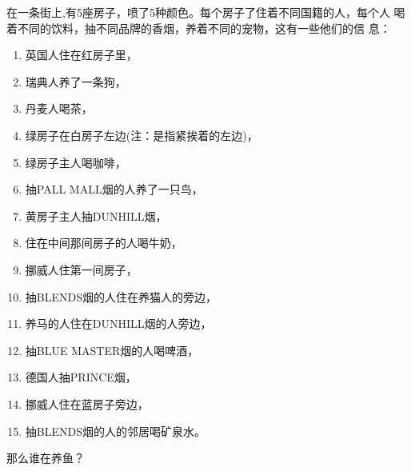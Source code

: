 \begin{example}[爱因斯坦难题]\label{ex:einstein's-problem}
  在一条街上,有5座房子，喷了5种颜色。每个房子了住着不同国籍的人，每个人
  喝着不同的饮料，抽不同品牌的香烟，养着不同的宠物，这有一些他们的信
  息：
  \begin{enumerate}
  \item 英国人住在红房子里，
  \item 瑞典人养了一条狗，
  \item 丹麦人喝茶，
  \item 绿房子在白房子左边(注：是指紧挨着的左边)，
  \item 绿房子主人喝咖啡，
  \item 抽PALL MALL烟的人养了一只鸟，
  \item 黄房子主人抽DUNHILL烟，
  \item 住在中间那间房子的人喝牛奶，
  \item 挪威人住第一间房子，
  \item 抽BLENDS烟的人住在养猫人的旁边，
  \item 养马的人住在DUNHILL烟的人旁边，
  \item 抽BLUE MASTER烟的人喝啤酒，
  \item 德国人抽PRINCE烟，
  \item 挪威人住在蓝房子旁边，
  \item 抽BLENDS烟的人的邻居喝矿泉水。
  \end{enumerate}
  那么谁在养鱼？
\end{example}
